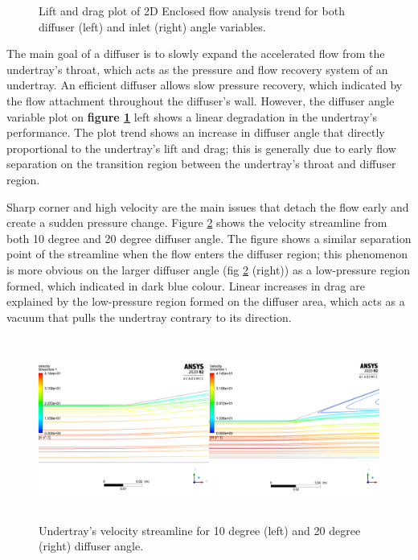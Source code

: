 \begin{figure}[!ht]
  \noindent
  \caption{Lift and drag plot of 2D Enclosed flow analysis trend for both diffuser (left) and inlet (right) angle variables. }
  \label{fig:2D_EN_result}
\end{figure}

\noindent The main goal of a diffuser is to slowly expand the accelerated flow from the undertray's throat, which acts as the pressure and flow recovery system of an undertray. An efficient diffuser allows slow pressure recovery, which indicated by the flow attachment throughout the diffuser's wall. However, the diffuser angle variable plot on \textbf{figure \ref{fig:2D_EN_result}} left shows a linear degradation in the undertray's performance. The plot trend shows an increase in diffuser angle that directly proportional to the undertray's lift and drag; this is generally due to early flow separation on the transition region between the undertray's throat and diffuser region. 

\noindent Sharp corner and high velocity are the main issues that detach the flow early and create a sudden pressure change. Figure \ref{fig:2D_EN_streamline_compare} shows the velocity streamline from both 10 degree and 20 degree diffuser angle. The figure shows a similar separation point of the streamline when the flow enters the diffuser region; this phenomenon is more obvious on the larger diffuser angle (fig \ref{fig:2D_EN_streamline_compare} (right)) as a low-pressure region formed, which indicated in dark blue colour. Linear increases in drag are explained by the low-pressure region formed on the diffuser area, which acts as a vacuum that pulls the undertray contrary to its direction.  

\begin{figure}[!ht]
    \centering
    \includegraphics[height= 6cm]{Figures/2D_EN/2D_EN_Streamline_compare.PNG}
    \caption{Undertray's velocity streamline for 10 degree (left) and 20 degree (right) diffuser angle.}
    \label{fig:2D_EN_streamline_compare}
\end{figure}

